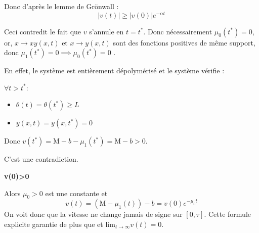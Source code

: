 \documentclass[a4paper]{article}
\newcommand{\mass}{\mathrm{M}}
\newcommand{\dep}{b}
\begin{document}
\begin{preuve}
	Donc d'après le lemme de Grönwall :
	\[ |v(t)| \geq |v(0)| e^{-\alpha t} \]
	
	Ceci contredit le fait que $v$ s'annule en $t=t^*$.
	Donc nécessairement $\mu_0(t^*) = 0$, 
	or, $x \to xy (x,t)$ et $x \to y(x,t)$ sont des fonctions positives de même support,
	donc $\mu_1(t^*) =0 \implies \mu_0(t^*)=0$ .
	
	En effet, le système est entièrement dépolymérisé et le système vérifie :
	
	$\forall t>t^*$:
	\begin{itemize}
		\item $\theta(t)= \theta(t^*) \geq L $
		\item $y(x,t)=y(x,t^*)= 0$
	\end{itemize}
	
	Donc $v(t^*) = \mass - \dep - \mu_1(t^*) = \mass- \dep > 0$.
	
	C'est une contradiction.	
	
	
	\vspace{0.3cm}
	\textbf{v(0)>0}
 	
	Alors $\mu_0>0$ est une constante et 
 	\[ v(t) = ( \mass - \mu_1 (t)) - \dep = v(0)e^{- \mu_0 t} \]
 	On voit donc que la vitesse ne change jamais de signe sur $[0,\tau]$.
	Cette formule explicite garantie de plus que et $\mathrm{lim}_{t \rightarrow \infty} v(t) = 0$.
	
\end{preuve}







\end{document}
